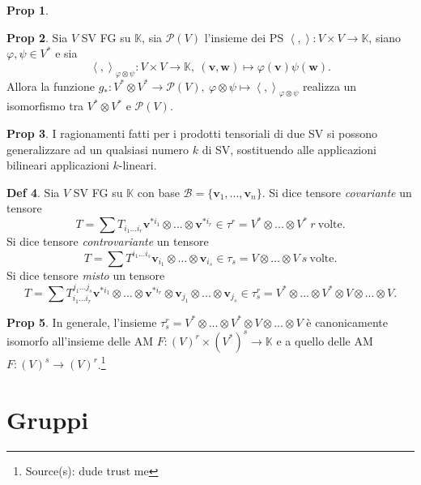 \documentclass[]{article}
\newcommand{\vv}{\mathbf{v}}
\newcommand{\vw}{\mathbf{w}}
\newcommand{\scalprod}[2]{\left\langle #1 , #2 \right\rangle}
\theoremstyle{definition}
\theoremstyle{definition}
\newtheorem{prop}{Prop}[subsection]
\theoremstyle{definition}
\newtheorem{dfn}[prop]{Def}
\begin{document}
\begin{prop}
\end{prop} \begin{prop} Sia $V$ SV FG su $\mathbb{K}$, sia $\mathcal{P}(V)$ l'insieme dei PS $\scalprod{}{}:V \times V \to \mathbb{K}$, siano $\varphi,\psi \in V^*$ e sia 
$$\scalprod{}{}_{\varphi \otimes \psi}:V \times V \to \mathbb{K},\ (\vv,\vw) \mapsto \varphi(\vv)\psi(\vw).$$
Allora la funzione $g_*:V^* \otimes V^* \to \mathcal{P}(V),\ \varphi \otimes \psi \mapsto \scalprod{}{}_{\varphi \otimes \psi}$ realizza un isomorfismo tra $V^* \otimes V^*$ e $\mathcal{P}(V)$.

\end{prop} \begin{prop} I ragionamenti fatti per i prodotti tensoriali di due SV si possono generalizzare ad un qualsiasi numero $k$ di SV, sostituendo alle applicazioni bilineari applicazioni $k$-lineari. 

\end{prop}  \begin{dfn} Sia $V$ SV FG su $\mathbb{K}$ con base $\mathcal{B}=\{ \vv _1 , ... , \vv _n \}$. Si dice tensore \emph{covariante} un tensore 
$$T= \sum T_{i_1...i_r} \vv^{*i_1} \otimes ... \otimes \vv^{*i_r} \in \tau^r = V^* \otimes ... \otimes V^*\ r\ \mathrm{volte}.$$
Si dice tensore \emph{controvariante} un tensore
$$T= \sum T^{i_1...i_s} \vv_{i_1} \otimes ... \otimes \vv_{i_s} \in \tau_s = V \otimes ... \otimes V\ s\ \mathrm{volte}.$$
Si dice tensore \emph{misto} un tensore
$$T= \sum T _{i_1...i_r} ^{j_1...j_s} \vv^{*i_1} \otimes ... \otimes \vv^{*i_r} \otimes \vv_{j_1} \otimes ... \otimes \vv_{j_s} \in \tau ^r _s = V^* \otimes ... \otimes V^* \otimes V \otimes ... \otimes V.$$

 \end{dfn} \begin{prop} In generale, l'insieme $\tau ^r _s =V^* \otimes ... \otimes V^* \otimes V \otimes ... \otimes V$ è canonicamente isomorfo all'insieme delle AM $F:(V)^r \times (V^*)^s \to \mathbb{K}$ e a quello delle AM $F:(V)^{s} \to (V)^{r}$.\footnote{Source(s): dude trust me}
\end{prop}

\section{Gruppi} 
\end{document}
